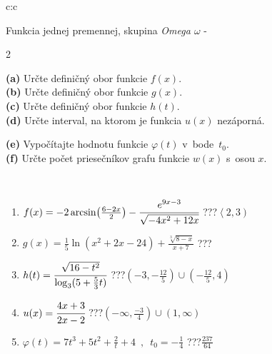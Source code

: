 \documentclass[10pt]{report}
\begin{document}
\begin{tabular}{c:c}
\begin{minipage}[c][104.5mm][t]{0.5\linewidth}
\begin{center}
\vspace{7mm}
{\huge Funkcia jednej premennej, skupina \textit{Omega $\omega$} -}\\[5mm]
\begin{minipage}{0.95\linewidth}
\begin{center}
{\small \begin{multicols}{2} \raggedright
\textbf{(a)} Určte definičný obor funkcie \(f(x)\). \\[1mm]
\textbf{(b)} Určte definičný obor funkcie \(g(x)\). \\[1mm]
\textbf{(c)} Určte definičný obor funkcie \(h(t)\). \\[1mm]
\textbf{(d)} Určte interval, na ktorom je funkcia \(u(x)\) nezáporná. \par \columnbreak
\textbf{(e)} Vypočítajte hodnotu funkcie \(\varphi(t)\) v~bode~\(t_0\). \\[1mm]
\textbf{(f)} Určte počet priesečníkov grafu funkcie \(w(x)\) s~osou \(x\). \\[1mm]
\end{multicols}
}
\end{center}
\end{minipage}
\\[4mm]
\begin{minipage}{0.79\linewidth}
\begin{center}
\begin{varwidth}{\linewidth}
\begin{enumerate}
\small
\item $f(x) = -2\arcsin\!\left( \frac{6-2x}{2} \right) - \cfrac{e^{9x-3}}{\sqrt{-4x^2+12x}}$\quad \dotfill\; ???\;\dotfill \quad $\left\langle2 , 3\right)$
\item $g(x) = \frac{1}{5} \ln{\!(x^2+2x-24)}+\frac{\sqrt[3]{8-x}}{x+7}$\quad \dotfill\; ???\;\dotfill {}
\item $h(t) = \cfrac{\sqrt{16-t^2}}{\log_3(5+\frac{5}{3}t)}$\quad \dotfill\; ???\;\dotfill \quad $\left(-3 , -\frac{12}{5}\right)\cup\left(-\frac{12}{5} , 4\right)$
\item $u(x) = \cfrac{4x+3}{2x-2}$\quad \dotfill\; ???\;\dotfill \quad $\left(-\infty , \frac{-3}{4}\right)\cup\left(1 , \infty\right)$
\item $\varphi(t) = 7t^3+5t^2+\frac{2}{t}+4 \enspace , \enspace t_0=-\frac{1}{4}$\quad \dotfill\; ???\;\dotfill \quad $\frac{237}{64}$

\end{enumerate}
\end{varwidth}
\end{center}
\end{minipage}
\end{center}
\end{minipage}
\end{tabular}
\end{document}
